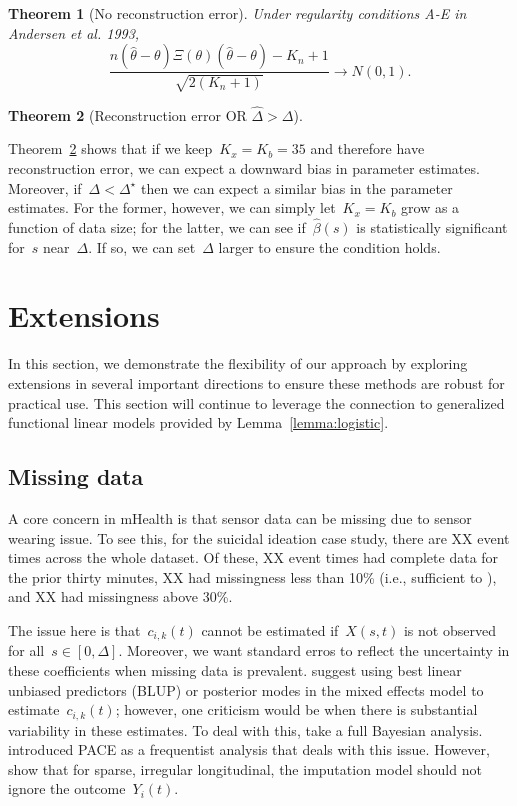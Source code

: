 \documentclass[11pt]{amsart}
\newtheorem{thm}{Theorem}[section]
\begin{document}
\begin{thm}[No reconstruction error]
\label{thm:truncation}
Under regularity conditions A-E in Andersen et al. 1993, 
\[
\frac{n (\hat \theta - \theta) \Xi (\theta) (\hat \theta - \theta) -
  K_n+1}{\sqrt{2 (K_n + 1) }} \to N(0,1).
\]

\end{thm}

\begin{thm}[Reconstruction error OR $\hat \Delta > \Delta$]
\label{thm:biaseddown}



\end{thm}

Theorem~\ref{thm:biaseddown} shows that if we keep~$K_x = K_b = 35$
and therefore have reconstruction error, we can expect a downward bias
in parameter estimates.
Moreover, if~$\Delta < \Delta^\star$ then we can expect a similar bias
in the parameter estimates.  For the former, however, we can simply
let~$K_x = K_b$ grow as a function of data size; for the latter, we
can see if~$\hat \beta(s)$ is statistically significant for~$s$
near~$\Delta$. If so, we can set~$\Delta$ larger to ensure the
condition holds.



\section{Extensions}

In this section, we demonstrate the flexibility of our approach by
exploring extensions in several important directions to ensure these
methods are robust for practical use.
This section will continue to leverage the connection to generalized
functional linear models provided by Lemma~\ref{lemma:logistic}.

\subsection{Missing data}
\label{section:missingdata}

A core concern in mHealth is that sensor data can be missing due to
sensor wearing issue.
To see this, for the suicidal ideation case study, there are XX event
times across the whole dataset.  Of these, XX event times had complete 
data for the prior thirty minutes, XX had missingness less than 10\%
(i.e., sufficient to ), and XX had missingness above 30\%.

The issue here is that~$c_{i,k} (t)$ cannot be estimated if~$X(s,t)$
is not observed for all~$s \in [0,\Delta]$. 
Moreover, we want standard erros to reflect the uncertainty
in these coefficients when missing data is prevalent.
\cite{Goldsmith2015} suggest using best linear unbiased predictors
(BLUP) or posterior modes in the mixed effects model to
estimate~$c_{i,k} (t)$; however, one criticism would be when there is
substantial variability in these estimates.  To deal with this,
\cite{Crainiceanu2010, Goldsmith2010} take a full Bayesian analysis.
\cite{Yao2005} introduced PACE as a frequentist analysis that deals
with this issue.
However,~\cite{Reimherr2018} show that for sparse, irregular
longitudinal, the imputation model should not ignore the outcome~$Y_i
(t)$.
\end{document}
